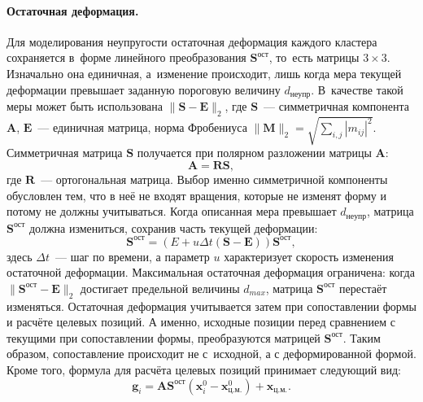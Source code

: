 \documentclass[a4paper, 12pt, titlepage]{extarticle}
\newcommand{\vect}[1]{\mathbf{#1}} %
\newcommand{\matx}[1]{\mathbf{#1}} %
\begin{document}
\begin{original}
        \paragraph{Остаточная деформация.} Для моделирования неупругости остаточная деформация
        каждого кластера сохраняется в~форме линейного преобразования $\matx{S}^{ост}$, то~есть
        матрицы $3 \times 3$. Изначально она единичная, а~изменение происходит, лишь когда мера
        текущей деформации превышает заданную пороговую величину $d_{неупр}$. В~качестве такой меры может быть
        использована $ \|\matx S - \matx E\|_2 $, где $\matx S$~--- симметричная компонента $\matx
        A$, $\matx E$~--- единичная матрица, норма Фробениуса $\|\matx M\|_2 = \sqrt{\sum_{i, j} |m_{ij}|^2}$.
        Симметричная матрица $\matx S$ получается при полярном разложении матрицы $\matx A$:
        \begin{equation}
          \matx A = \matx R \matx S,
        \end{equation}
        где $\matx R$~--- ортогональная матрица. Выбор именно симметричной компоненты обусловлен
        тем, что в неё не входят вращения, которые не изменят форму и потому не должны учитываться.
        Когда описанная мера превышает $d_{неупр}$, матрица $\matx{S}^{ост}$ должна измениться,
        сохранив часть текущей деформации:
        \begin{equation}
          \matx{S}^{ост} = \left(E + u \Delta t (\matx S - \matx E) \right) \matx{S}^{ост},
        \end{equation}
        здесь $\Delta t$~--- шаг по времени, а параметр $u$ характеризует скорость изменения
        остаточной деформации. Максимальная остаточная деформация ограничена: когда
        $\|\matx{S}^{ост} - \matx E\|_2$ достигает предельной величины $d_{max}$, матрица
        $\matx{S}^{ост}$ перестаёт изменяться. Остаточная деформация учитывается затем при
        сопоставлении формы и расчёте целевых позиций. А именно, исходные позиции перед сравнением
        с текущими при сопоставлении формы, преобразуются матрицей $\matx{S}^{ост}$. Таким
        образом, сопоставление происходит не с~исходной, а с деформированной формой. Кроме того, формула для
        расчёта целевых позиций принимает следующий вид:
        \begin{equation}
          \vect{g}_i = \matx{A} \matx{S}^{ост} (\vect{x}^0_i - \vect{x}^0_{ц.м.}) + \vect{x}_{ц.м.}.
        \end{equation}
\end{original}
\end{document}
